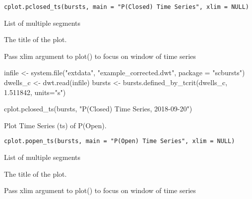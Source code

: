 \documentclass[letterpaper]{book}
\begin{document}
%
\begin{Usage}
\begin{verbatim}
cplot.pclosed_ts(bursts, main = "P(Closed) Time Series", xlim = NULL)
\end{verbatim}
\end{Usage}
%
\begin{Arguments}
\begin{ldescription}
\item[\code{bursts}] List of multiple segments

\item[\code{main}] The title of the plot.

\item[\code{xlim}] Pass xlim argument to plot() to focus on window of time series
\end{ldescription}
\end{Arguments}
%
\begin{Examples}
\begin{ExampleCode}

infile <- system.file("extdata", "example_corrected.dwt", package = "scbursts")
dwells_c <- dwt.read(infile)
bursts <- bursts.defined_by_tcrit(dwells_c, 1.511842, units="s")

cplot.pclosed_ts(bursts, "P(Closed) Time Series, 2018-09-20")

\end{ExampleCode}
\end{Examples}
%
\begin{Description}\relax
Plot Time Series (ts) of P(Open).
\end{Description}
%
\begin{Usage}
\begin{verbatim}
cplot.popen_ts(bursts, main = "P(Open) Time Series", xlim = NULL)
\end{verbatim}
\end{Usage}
%
\begin{Arguments}
\begin{ldescription}
\item[\code{bursts}] List of multiple segments

\item[\code{main}] The title of the plot.

\item[\code{xlim}] Pass xlim argument to plot() to focus on window of time series
\end{ldescription}
\end{Arguments}
\end{document}
